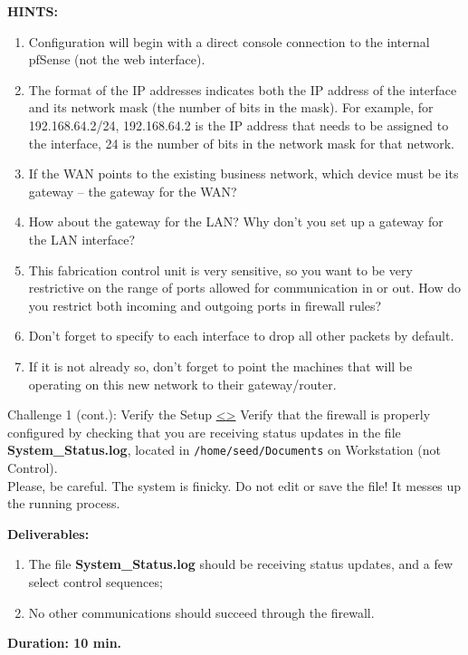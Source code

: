 \documentclass[12pt]{extarticle}
\newenvironment{instructionblock}{\Large\bgroup}{\egroup}
\newcommand{\ben}{\begin{enumerate}}
\newcommand{\een}{\end{enumerate}}
\begin{document}
\vspace{8mm}
\noindent
\textbf{HINTS:}
\begin{enumerate}
    \item Configuration will begin with a direct console connection to the internal pfSense (not the web interface).
    \item The format of the IP addresses indicates both the IP address of the interface and its network mask (the number of bits in the mask). For example, for 192.168.64.2/24, 192.168.64.2 is the IP address that needs to be assigned to the interface, 24 is the number of bits in the network mask for that network.
    \item If the WAN points to the existing business network, which device must be its gateway -- the gateway for the WAN?
    \item How about the gateway for the LAN? Why don't you set up a gateway for the LAN interface?
    \item This fabrication control unit is very sensitive, so you want to be very restrictive on the range of ports allowed for communication in or out. How do you restrict both incoming and outgoing ports in firewall rules?
    \item Don't forget to specify to each interface to drop all other packets by default.
    \item If it is not already so, don't forget to point the machines that will be operating on this new network to their gateway/router.
\end{enumerate}








\pagebreak
\begin{slide}{ Challenge 1 (cont.): Verify the Setup }{ \hyperref[slide 10]{\textless}\hyperref[slide 12]{\textgreater} }
\vskip 5pt
\begin{instructionblock}
  Verify that the firewall is properly configured by checking that you are receiving status updates in the file \textbf{System\_Status.log}, located in \texttt{/home/seed/Documents} on Workstation (not Control).\\
   
  Please, be careful. The system is finicky. Do not edit or save the file! It messes up the running process.
  

	\textbf{\Large{Deliverables:}}
	\ben
		\item The file \textbf{System\_Status.log} should be receiving status updates, and a few select control sequences;
		\item No other communications should succeed through the firewall.
	\een

  \vspace{20mm}
  \begin{center}
  \textbf{\Large{Duration: 10 min.} }
  \end{center}

\end{instructionblock}
\end{slide}
\end{document}

